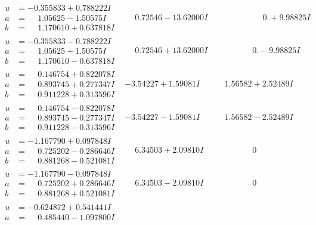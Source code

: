 \documentclass[1p]{elsarticle_modified}
\theoremstyle{definition}
\begin{document}
$$\begin{array}{c|c|c}
\begin{aligned}
u &= -0.355833 + 0.788222 I \\
a &= \phantom{-}1.05625 - 1.50575 I \\
b &= \phantom{-}1.170610 + 0.637818 I\end{aligned}
 & \phantom{-}0.72546 - 13.62000 I & \phantom{-0.000000 -}0. + 9.98825 I \\ \hline\begin{aligned}
u &= -0.355833 - 0.788222 I \\
a &= \phantom{-}1.05625 + 1.50575 I \\
b &= \phantom{-}1.170610 - 0.637818 I\end{aligned}
 & \phantom{-}0.72546 + 13.62000 I & \phantom{-0.000000 } 0. - 9.98825 I \\ \hline\begin{aligned}
u &= \phantom{-}0.146754 + 0.822078 I \\
a &= \phantom{-}0.893745 + 0.277347 I \\
b &= \phantom{-}0.911228 + 0.313596 I\end{aligned}
 & -3.54227 + 1.59081 I & \phantom{-}1.56582 + 2.52489 I \\ \hline\begin{aligned}
u &= \phantom{-}0.146754 - 0.822078 I \\
a &= \phantom{-}0.893745 - 0.277347 I \\
b &= \phantom{-}0.911228 - 0.313596 I\end{aligned}
 & -3.54227 - 1.59081 I & \phantom{-}1.56582 - 2.52489 I \\ \hline\begin{aligned}
u &= -1.167790 + 0.097848 I \\
a &= \phantom{-}0.725202 - 0.286646 I \\
b &= \phantom{-}0.881268 - 0.521081 I\end{aligned}
 & \phantom{-}6.34503 + 2.09810 I & \phantom{-0.000000 } 0 \\ \hline\begin{aligned}
u &= -1.167790 - 0.097848 I \\
a &= \phantom{-}0.725202 + 0.286646 I \\
b &= \phantom{-}0.881268 + 0.521081 I\end{aligned}
 & \phantom{-}6.34503 - 2.09810 I & \phantom{-0.000000 } 0 \\ \hline\begin{aligned}
u &= -0.624872 + 0.541441 I \\
a &= \phantom{-}0.485440 - 1.097800 I \\

\end{aligned}
\end{array}$$
\end{document}
